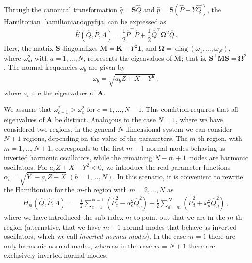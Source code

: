 \documentclass[12pt]{iopart}
\begin{document}
Through the canonical transformation $\hat{q}=\boldsymbol{S}\hat{Q}$ and $\hat{p}=\boldsymbol{S} \left( \hat{P}-Y \hat{Q} \right)$, the Hamiltonian \eqref{hamiltonianoqpyfija} can be expressed as
\begin{align}
\hat{H}(\hat{Q},\hat{P},  \Lambda)=\dfrac{1}{2}\hat{P}^{\intercal}\hat{P}+\dfrac{1}{2}\hat{Q}^{\intercal}\boldsymbol{\Omega}^2\hat{Q}\,.
\end{align}
Here, the matrix $\boldsymbol{S}$ diagonalizes $\boldsymbol{M}=\boldsymbol{K}-Y^2\boldsymbol{1}$, and $\boldsymbol{\Omega}=\operatorname{diag}(\omega_1, \dots, \omega_N)$, where $\omega_a^2$, with $a=1, \dots, N$, represents the eigenvalues of $\boldsymbol{M}$; that is, $\boldsymbol{S}^{\intercal} \boldsymbol{M} \boldsymbol{S}=\boldsymbol{\Omega}^2$. The normal frequencies $\omega_b$ are given by
\begin{align}
    \omega_b=\sqrt{a_b Z+X-Y^2}\,,
\end{align} 
where $a_b$ are the eigenvalues of $\boldsymbol{A}$.

We assume that $\omega_{c+1}^2>\omega_{c}^2$ for $c=1,\dots, N-1$. This condition requires that all eigenvalues of $\boldsymbol{A}$ be distinct. Analogous to the case $N=1$, where we have considered two regions, in the general $N$-dimensional system we can consider $N+1$ regions, depending on the value of the parameters. The $m$-th region, with $m=1,..., N+1$, corresponds to the first $m-1$ normal modes behaving as inverted harmonic oscillators, while the remaining $N-m+1$ modes are harmonic oscillators. For $a_b Z+X-Y^2<0$, we introduce the real parameter functions $\alpha_b=\sqrt{Y^2-a_bZ-X}$ $(b=1,\dots,N)$. In this scenario, it is convenient to rewrite the Hamiltonian for the $m$-th region with $m=2,\ldots, N$ as
\begin{align}\label{Hamilregm}
    H_{m}(\hat{Q},\hat{P},  \Lambda)=&\frac{1}{2}\sum_{c=1}^{m-1} ( \hat{P}_c^2-\alpha_c^2 \hat{Q}_c^2)+\frac{1}{2}\sum_{d=m}^{N} (\hat{P}_d^2+\omega_d^2 \hat{Q}_d^2)\,,
\end{align}
where we have introduced the sub-index $m$ to point out that we are in the  $m$-th region (alternative, that we have $m-1$ normal modes that behave as inverted oscillators, which we call {\it{inverted normal modes}}). In the case $m=1$ there are only harmonic normal modes, whereas in the case $m=N+1$ there are exclusively inverted normal modes.
\end{document}

